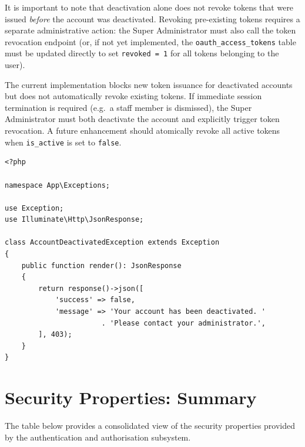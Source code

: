 It is important to note that deactivation alone does not revoke tokens
that were issued \emph{before} the account was deactivated. Revoking
pre-existing tokens requires a separate administrative action: the Super
Administrator must also call the token revocation endpoint (or, if not
yet implemented, the \texttt{oauth\_access\_tokens} table must be
updated directly to set \texttt{revoked = 1} for all tokens belonging
to the user).

\begin{warningbox}
  The current implementation blocks new token issuance for deactivated
  accounts but does not automatically revoke existing tokens. If
  immediate session termination is required (e.g.\ a staff member is
  dismissed), the Super Administrator must both deactivate the account
  and explicitly trigger token revocation. A future enhancement should
  atomically revoke all active tokens when \texttt{is\_active} is set
  to \texttt{false}.
\end{warningbox}

\begin{lstlisting}[style=php, caption={\texttt{app/Exceptions/AccountDeactivatedException.php}
  --- Renders as HTTP 403 Forbidden.}]
<?php

namespace App\Exceptions;

use Exception;
use Illuminate\Http\JsonResponse;

class AccountDeactivatedException extends Exception
{
    public function render(): JsonResponse
    {
        return response()->json([
            'success' => false,
            'message' => 'Your account has been deactivated. '
                       . 'Please contact your administrator.',
        ], 403);
    }
}
\end{lstlisting}

\section{Security Properties: Summary}
\label{sec:auth-security-summary}

The table below provides a consolidated view of the security properties
provided by the authentication and authorisation subsystem.

